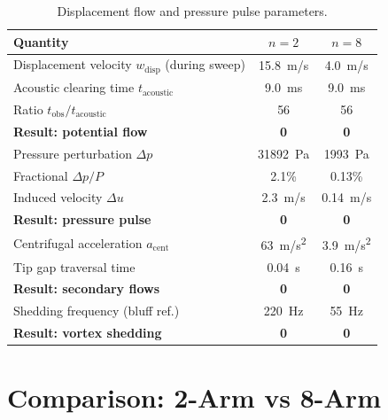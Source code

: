 \documentclass[11pt,a4paper]{article}
\begin{document}
\begin{table}[H]
\centering
\caption{Displacement flow and pressure pulse parameters.}
\label{tab:potential}
\begin{tabular}{lcc}
\toprule
Quantity & $n = 2$ & $n = 8$ \\
\midrule
Displacement velocity $w_\mathrm{disp}$ (during sweep) & \SI{15.8}{m/s} & \SI{4.0}{m/s} \\
Acoustic clearing time $t_\mathrm{acoustic}$ & \SI{9.0}{ms} & \SI{9.0}{ms} \\
Ratio $t_\mathrm{obs}/t_\mathrm{acoustic}$ & 56 & 56 \\
\textbf{Result: potential flow} & \textbf{0} & \textbf{0} \\
\midrule
Pressure perturbation $\Delta p$ & \SI{31892}{Pa} & \SI{1993}{Pa} \\
Fractional $\Delta p / P$ & 2.1\% & 0.13\% \\
Induced velocity $\Delta u$ & \SI{2.3}{m/s} & \SI{0.14}{m/s} \\
\textbf{Result: pressure pulse} & \textbf{0} & \textbf{0} \\
\midrule
Centrifugal acceleration $a_\mathrm{cent}$ & \SI{63}{m/s^2} & \SI{3.9}{m/s^2} \\
Tip gap traversal time & \SI{0.04}{s} & \SI{0.16}{s} \\
\textbf{Result: secondary flows} & \textbf{0} & \textbf{0} \\
\midrule
Shedding frequency (bluff ref.) & \SI{220}{Hz} & \SI{55}{Hz} \\
\textbf{Result: vortex shedding} & \textbf{0} & \textbf{0} \\
\bottomrule
\end{tabular}
\end{table}


\section{Comparison: 2-Arm vs 8-Arm}
\label{sec:comparison}
\end{document}
